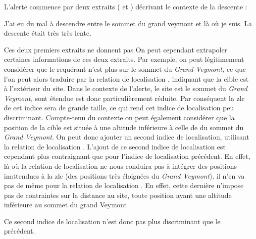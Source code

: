 L'alerte commence par deux extraits ( et ) décrivant
le contexte de la descente :
%
\begin{dialogue}
  \Req {} J'ai eu du mal à descendre entre le sommet du grand
veymont et là où je suis.  La descente était très très lente.
\end{dialogue}
%
Ces deux premiers extraits ne donnent pas
%
On peut cependant extrapoler certaines informations de ces deux
extraits. Par exemple, on peut légitimement considérer que le
requérant n'est plus sur le sommet du \emph{Grand Veymont,} ce que
l'on peut alors traduire par la relation de localisation
, indiquant que la cible est à
l'extérieur du site. Dans le contexte de l'alerte, le site est le
sommet du \emph{Grand Veymont,} sont étendue est donc particulièrement
réduite. Par conséquent la \ac{zlc} de cet indice sera de grande
taille, ce qui rend cet indice de localisation peu discriminant.
%
Compte-tenu du contexte on peut également considérer que la position
de la cible est située à une altitude inférieure à celle de du sommet
du \emph{Grand Veymont}.
%
On peut donc ajouter un second indice de localisation, utilisant la
relation de localisation . L'ajout de ce
second indice de localisation est cependant plus contraignant que pour
l'indice de localisation précédent. En effet, là où la relation de
localisation  ne nous conduira pas
à intégrer des positions inattendues à la \ac{zlc} (\eg des positions
très éloignées du \emph{Grand Veymont}), il n'en va pas de même pour
la relation de localisation . En effet,
cette dernière n'impose pas de contraintes sur la distance au site,
toute position ayant une altitude inférieure au sommet du grand
Veymont




Ce second indice de localisation n'est donc pas plus discriminant que
le précédent.


